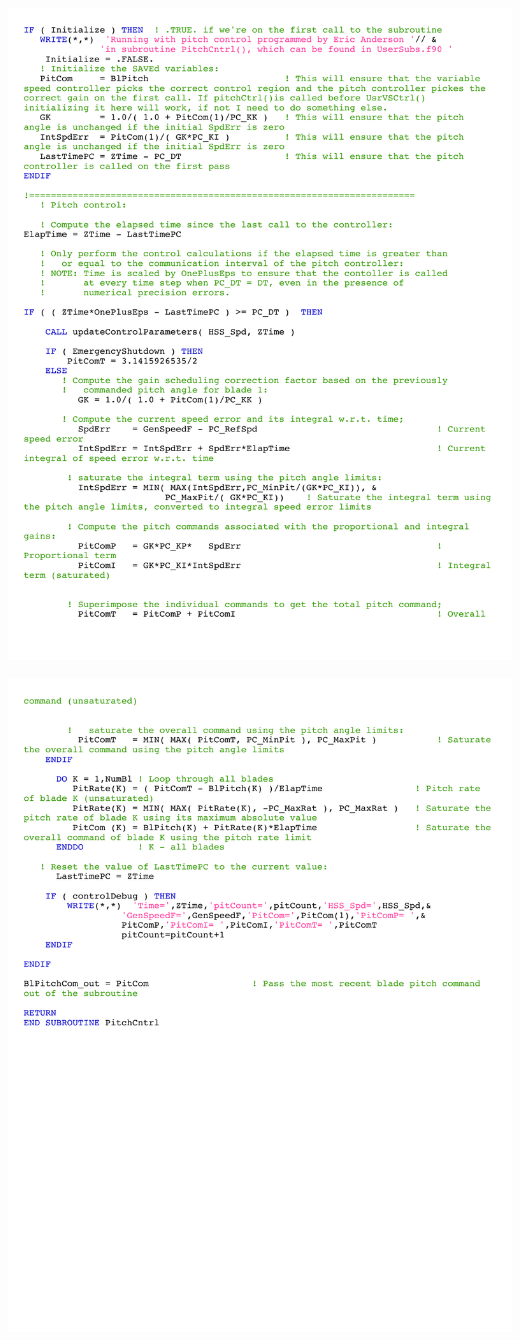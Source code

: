 \noindent
\includegraphics[width=\linewidth]{Figures/AppendixDFigures/figD-1C.pdf}

\noindent
\includegraphics[width=\linewidth]{Figures/AppendixDFigures/figD-1D.pdf}


